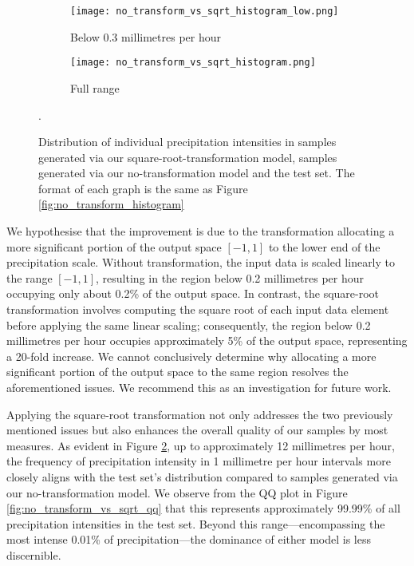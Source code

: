 \documentclass[ oneside,%
                    author={George Herbert},
                    degree={MSci},
                     title={Diffusion Models for Time-Evolving Precipitation Fields},
                  subtitle={}]{dissertation}
\begin{document}
\begin{figure}[htbp]
      \centering
      \begin{subfigure}{.49\textwidth}
            \texttt{[image: no\_transform\_vs\_sqrt\_histogram\_low.png]}
            \caption{Below 0.3 millimetres per hour}
            \label{fig:no_transform_vs_sqrt_histogram_low}
      \end{subfigure}
      \begin{subfigure}{.49\textwidth}
            \texttt{[image: no\_transform\_vs\_sqrt\_histogram.png]}
            \caption{Full range}
            \label{fig:no_transform_vs_sqrt_histogram_full}
      \end{subfigure}
      \caption{Distribution of individual precipitation intensities in samples generated via our square-root-transformation model, samples generated via our no-transformation model and the test set. The format of each graph is the same as Figure \ref{fig:no_transform_histogram}}.
      \label{fig:no_transform_vs_sqrt_histogram}
\end{figure}

We hypothesise that the improvement is due to the transformation allocating a more significant portion of the output space $[-1, 1]$ to the lower end of the precipitation scale. Without transformation, the input data is scaled linearly to the range $[-1, 1]$, resulting in the region below 0.2 millimetres per hour occupying only about 0.2\% of the output space. In contrast, the square-root transformation involves computing the square root of each input data element before applying the same linear scaling; consequently, the region below 0.2 millimetres per hour occupies approximately 5\% of the output space, representing a 20-fold increase. We cannot conclusively determine why allocating a more significant portion of the output space to the same region resolves the aforementioned issues. We recommend this as an investigation for future work.

Applying the square-root transformation not only addresses the two previously mentioned issues but also enhances the overall quality of our samples by most measures. As evident in Figure \ref{fig:no_transform_vs_sqrt_histogram_full}, up to approximately 12 millimetres per hour, the frequency of precipitation intensity in 1 millimetre per hour intervals more closely aligns with the test set's distribution compared to samples generated via our no-transformation model. We observe from the QQ plot in Figure \ref{fig:no_transform_vs_sqrt_qq} that this represents approximately 99.99\% of all precipitation intensities in the test set. Beyond this range---encompassing the most intense 0.01\% of precipitation---the dominance of either model is less discernible.
\end{document}
